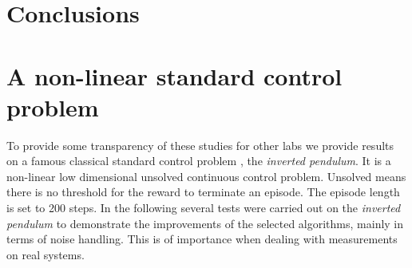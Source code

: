 \documentclass[
 reprint,
 amsmath,amssymb,amsfonts,clevref,
 aps,
prstab,
]{revtex4-2}
\begin{document}
\section{Conclusions}


\appendix
\section{A non-linear standard control problem}
To provide some transparency of these studies for other labs we provide results on a famous classical standard control problem \cite{Furutaa}, the \emph{inverted pendulum}. It is a non-linear low dimensional unsolved continuous control problem. Unsolved means there is no threshold for the reward to terminate an episode. The episode length is set to 200 steps. In the following several tests were carried out on the \emph{inverted pendulum} to demonstrate the improvements of the selected algorithms, mainly in terms of noise handling. This is of importance when dealing with measurements on real systems.
\end{document}
